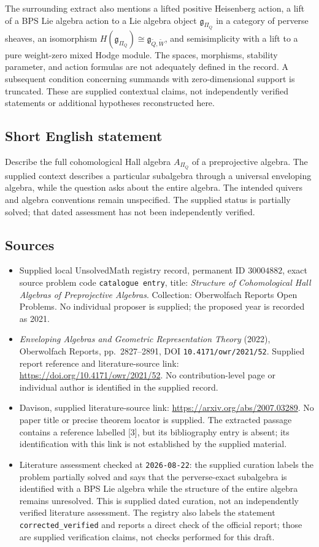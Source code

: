 \documentclass[11pt]{article}
\begin{document}
The surrounding extract also mentions a lifted positive Heisenberg action, a lift of a BPS Lie algebra action to a Lie algebra object \(\mathfrak g_{\Pi_Q}\) in a category of perverse sheaves, an isomorphism \(H(\mathfrak g_{\Pi_Q})\cong\mathfrak g_{\widetilde Q,\widetilde W}\), and semisimplicity with a lift to a pure weight-zero mixed Hodge module. The spaces, morphisms, stability parameter, and action formulas are not adequately defined in the record. A subsequent condition concerning summands with zero-dimensional support is truncated. These are supplied contextual claims, not independently verified statements or additional hypotheses reconstructed here.
\subsection{Short English statement}
Describe the full cohomological Hall algebra \(A_{\Pi_Q}\) of a preprojective algebra. The supplied context describes a particular subalgebra through a universal enveloping algebra, while the question asks about the entire algebra. The intended quivers and algebra conventions remain unspecified. The supplied status is partially solved; that dated assessment has not been independently verified.
\subsection{Sources}
\begin{itemize}
\item Supplied local UnsolvedMath registry record, permanent ID \(30004882\), exact source problem code \texttt{catalogue entry}, title: \emph{Structure of Cohomological Hall Algebras of Preprojective Algebras}. Collection: Oberwolfach Reports Open Problems. No individual proposer is supplied; the proposed year is recorded as 2021.
\item \emph{Enveloping Algebras and Geometric Representation Theory} (2022), Oberwolfach Reports, pp.\ 2827--2891, DOI \texttt{10.4171/owr/2021/52}. Supplied report reference and literature-source link: \url{https://doi.org/10.4171/owr/2021/52}. No contribution-level page or individual author is identified in the supplied record.
\item Davison, supplied literature-source link: \url{https://arxiv.org/abs/2007.03289}. No paper title or precise theorem locator is supplied. The extracted passage contains a reference labelled [3], but its bibliography entry is absent; its identification with this link is not established by the supplied material.
\item Literature assessment checked at \texttt{2026-08-22}: the supplied curation labels the problem partially solved and says that the perverse-exact subalgebra is identified with a BPS Lie algebra while the structure of the entire algebra remains unresolved. This is supplied dated curation, not an independently verified literature assessment. The registry also labels the statement \texttt{corrected\_verified} and reports a direct check of the official report; those are supplied verification claims, not checks performed for this draft.
\end{itemize}
\end{document}
